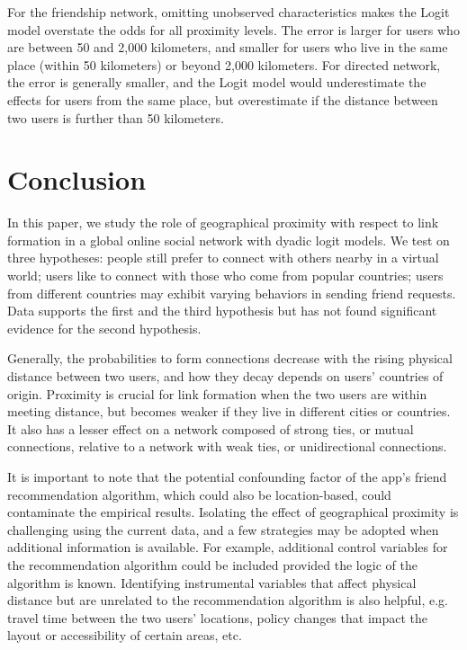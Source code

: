 For the friendship network, omitting unobserved characteristics makes the Logit model overstate the odds for all proximity levels. The error is larger for users who are between 50 and 2,000 kilometers, and smaller for users who live in the same place (within 50 kilometers) or beyond 2,000 kilometers. For directed network, the error is generally smaller, and the Logit model would underestimate the effects for users from the same place, but overestimate if the distance between two users is further than 50 kilometers.

\section{Conclusion}

In this paper, we study the role of geographical proximity with respect to link formation in a global online social network with dyadic logit models. We test on three hypotheses: people still prefer to connect with others nearby in a virtual world; users like to connect with those who come from popular countries; users from different countries may exhibit varying behaviors in sending friend requests. Data supports the first and the third hypothesis but has not found significant evidence for the second hypothesis.

Generally, the probabilities to form connections decrease with the rising physical distance between two users, and how they decay depends on users' countries of origin. Proximity is crucial for link formation when the two users are within meeting distance, but becomes weaker if they live in different cities or countries. It also has a lesser effect on a network composed of strong ties, or mutual connections, relative to a network with weak ties, or unidirectional connections.

It is important to note that the potential confounding factor of the app's friend recommendation algorithm, which could also be location-based, could contaminate the empirical results. Isolating the effect of geographical proximity is challenging using the current data, and a few strategies may be adopted when additional information is available. For example, additional control variables for the recommendation algorithm could be included provided the logic of the algorithm is known. Identifying instrumental variables that affect physical distance but are unrelated to the recommendation algorithm is also helpful, e.g. travel time between the two users' locations, policy changes that impact the layout or accessibility of certain areas, etc.

